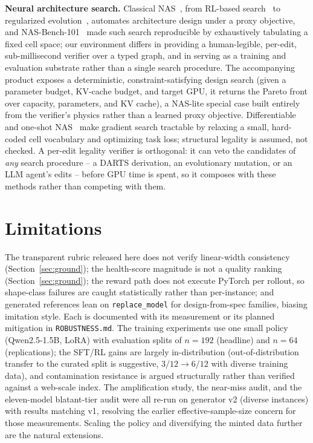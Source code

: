\documentclass{article}
\begin{document}
\textbf{Neural architecture search.} Classical NAS~\cite{nassurvey}, from RL-based search~\cite{zophle} to regularized evolution~\cite{amoeba}, automates architecture design under a proxy objective, and NAS-Bench-101~\cite{nasbench} made such search reproducible by exhaustively tabulating a fixed cell space; our environment differs in providing a human-legible, per-edit, sub-millisecond verifier over a typed graph, and in serving as a training and evaluation substrate rather than a single search procedure. The accompanying product exposes a deterministic, constraint-satisfying design search (given a parameter budget, KV-cache budget, and target GPU, it returns the Pareto front over capacity, parameters, and KV cache), a NAS-lite special case built entirely from the verifier's physics rather than a learned proxy objective. Differentiable and one-shot NAS~\cite{darts} make gradient search tractable by relaxing a small, hard-coded cell vocabulary and optimizing task loss; structural legality is assumed, not checked. A per-edit legality verifier is orthogonal: it can veto the candidates of \emph{any} search procedure -- a DARTS derivation, an evolutionary mutation, or an LLM agent's edits -- before GPU time is spent, so it composes with these methods rather than competing with them.

\section{Limitations}
The transparent rubric released here does not verify linear-width consistency (Section~\ref{sec:ground}); the health-score magnitude is not a quality ranking (Section~\ref{sec:ground}); the reward path does not execute PyTorch per rollout, so shape-class failures are caught statistically rather than per-instance; and generated references lean on \texttt{replace\_model} for design-from-spec families, biasing imitation style. Each is documented with its measurement or its planned mitigation in \texttt{ROBUSTNESS.md}. The training experiments use one small policy (Qwen2.5-1.5B, LoRA) with evaluation splits of $n{=}192$ (headline) and $n{=}64$ (replications); the SFT/RL gains are largely in-distribution (out-of-distribution transfer to the curated split is suggestive, $3/12\to6/12$ with diverse training data), and contamination resistance is argued structurally rather than verified against a web-scale index. The amplification study, the near-miss audit, and the eleven-model blatant-tier audit were all re-run on generator v2 (diverse instances) with results matching v1, resolving the earlier effective-sample-size concern for those measurements. Scaling the policy and diversifying the minted data further are the natural extensions.
\end{document}
